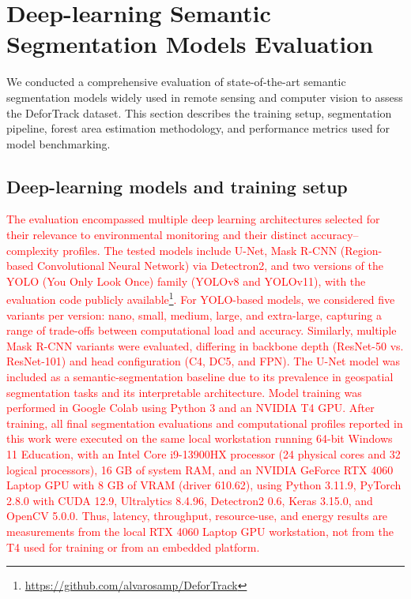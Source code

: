 \documentclass[journal,article,submit,pdftex,moreauthors]{Definitions/mdpi}
\begin{document}
\section{Deep-learning Semantic Segmentation Models Evaluation}
\label{sec:evaluation}

We conducted a comprehensive evaluation of state-of-the-art semantic segmentation models widely used in remote sensing and computer vision to assess the DeforTrack dataset. This section describes the training setup, segmentation pipeline, forest area estimation methodology, and performance metrics used for model benchmarking.

\subsection{Deep-learning models and training setup}

\textcolor{red}{The evaluation encompassed multiple deep learning architectures selected for their relevance to environmental monitoring and their distinct accuracy--complexity profiles. The tested models include U-Net, Mask R-CNN (Region-based Convolutional Neural Network) via Detectron2, and two versions of the YOLO (You Only Look Once) family (YOLOv8 and YOLOv11), with the evaluation code publicly available\footnote{\url{https://github.com/alvarosamp/DeforTrack}}.}
\textcolor{red}{For YOLO-based models, we considered five variants per version: nano, small, medium, large, and extra-large, capturing a range of trade-offs between computational load and accuracy. Similarly, multiple Mask R-CNN variants were evaluated, differing in backbone depth (ResNet-50 vs. ResNet-101) and head configuration (C4, DC5, and FPN). The U-Net model was included as a semantic-segmentation baseline due to its prevalence in geospatial segmentation tasks and its interpretable architecture. Model training was performed in Google Colab using Python 3 and an NVIDIA T4 GPU. After training, all final segmentation evaluations and computational profiles reported in this work were executed on the same local workstation running 64-bit Windows 11 Education, with an Intel Core i9-13900HX processor (24 physical cores and 32 logical processors), 16 GB of system RAM, and an NVIDIA GeForce RTX 4060 Laptop GPU with 8 GB of VRAM (driver 610.62), using Python 3.11.9, PyTorch 2.8.0 with CUDA 12.9, Ultralytics 8.4.96, Detectron2 0.6, Keras 3.15.0, and OpenCV 5.0.0. Thus, latency, throughput, resource-use, and energy results are measurements from the local RTX 4060 Laptop GPU workstation, not from the T4 used for training or from an embedded platform.}
\end{document}
